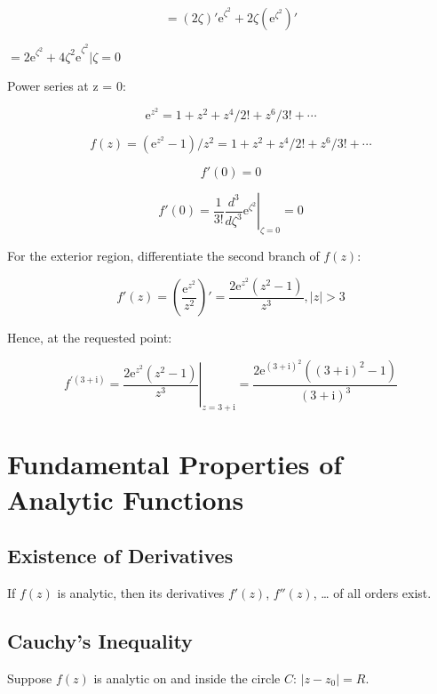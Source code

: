 \documentclass[11pt,a4paper]{article}
\theoremstyle{definition}
\theoremstyle{plain}
\begin{document}
\[
= (2\zeta){'\mathrm{e}}^{\zeta^{2}} + 2\zeta(\mathrm{e}^{\zeta^{2}})'
\]

$= {2\mathrm{e}}^{\zeta^{2}} + {4\zeta^{2}\mathrm{e}}^{\zeta^{2}}$$\vert{}\zeta = 0$

Power series at z = 0:

\begin{equation}
\mathrm{e}^{z^{2}} = 1 + z^{2} + z^{4}/2!+z^{6}/3!+\cdots
\end{equation}

\[
f(z) = (\mathrm{e}^{z^{2}} - 1)/z^{2} = 1 + z^{2} + z^{4}/2!+z^{6}/3!+\cdots
\]

\[
f'(0) = 0
\]

\[
f'(0) = \frac{1}{3!}{\left.\frac{d^{3}}{d\zeta^{3}}\mathrm{e}^{\zeta^{2}}\right\vert{}}_{\zeta = 0} = 0
\]

For the exterior region, differentiate the second branch of $f(z)$:

\begin{equation}
f'(z) = \left(\frac{\mathrm{e}^{z^{2}}}{z^{2}}\right)'= \frac{2\mathrm{e}^{z^{2}}(z^{2} - 1)}{z^{3}}, \vert{}z\vert{} > 3
\end{equation}

Hence, at the requested point:

\begin{equation}
f^{'(3 + \mathrm{i})} = {\left.\frac{2\mathrm{e}^{z^{2}}(z^{2} - 1)}{z^{3}}\right\vert{}}_{z = 3 + \mathrm{i}} = \frac{2\mathrm{e}^{{(3 + \mathrm{i})}^{2}}({(3 + \mathrm{i})}^{2} - 1)}{{(3 + \mathrm{i})}^{3}}
\end{equation}

\section{Fundamental Properties of Analytic Functions}

\subsection{Existence of Derivatives}

If $f(z)$ is analytic, then its derivatives $f'(z)$, $f''(z)$, \ldots{} of all orders exist.

\subsection{Cauchy's Inequality}

Suppose $f(z)$ is analytic on and inside the circle $C$: $\vert{}z - z_{0}\vert{} = R$.
\end{document}
